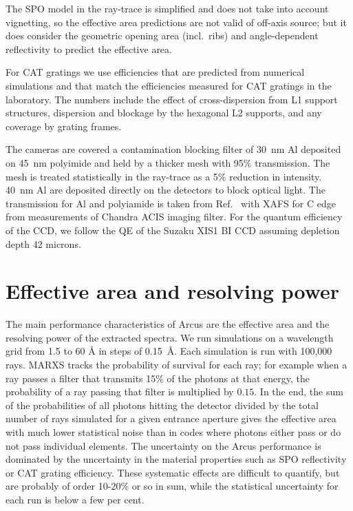 \documentclass[12pt]{spieman}  %
\begin{document}
\begin{spacing}{2}
The SPO model in the ray-trace is simplified and does not take into account vignetting, so the effective area predictions are not valid of off-axis source; but it does consider the geometric opening area (incl.\ ribs) and angle-dependent reflectivity to predict the effective area.

For CAT gratings we use efficiencies that are predicted from numerical simulations and that match the efficiencies measured for CAT gratings in the laboratory. The numbers include the effect of cross-dispersion from L1 support structures, dispersion and blockage by the hexagonal L2 supports, and any coverage by grating frames.


The cameras are covered a contamination blocking filter of 30~nm Al deposited on 45~nm polyimide and held by a thicker mesh with 95\% transmission. The mesh is treated statistically in the ray-trace as a 5\% reduction in intensity. 40~nm Al are deposited directly on the detectors to block optical light. The transmission for Al and polyiamide is taken from Ref.~ with XAFS for C edge from measurements of Chandra ACIS imaging filter\cite{10.1117/12.245111}.
For the quantum efficiency of the CCD, we follow the QE of the Suzaku XIS1 BI CCD assuming depletion depth 42 microns\cite{2007PASJ...59S..23K}.




\section{Effective area and resolving power}
The main performance characteristics of Arcus are the effective area and the resolving power of the extracted spectra. We run simulations on a wavelength grid from 1.5 to 60 \AA{} in steps of 0.15~\AA{}. Each simulation is run with 100,000 rays. MARXS tracks the probability of survival for each ray; for example when a ray passes a filter that transmits 15\% of the photons at that energy, the probability of a ray passing that filter is multiplied by $0.15$. In the end, the sum of the probabilities of all photons hitting the detector divided by the total number of rays simulated for a given entrance aperture gives the effective area with much lower statistical noise than in codes where photons either pass or do not pass individual elements. The uncertainty on the Arcus performance is dominated by the uncertainty in the material properties such as SPO reflectivity or CAT grating efficiency. These systematic effects are difficult to quantify, but are probably of order 10-20\% or so in sum, while the statistical uncertainty for each run is below a few per cent.


\end{spacing}
\end{document}

